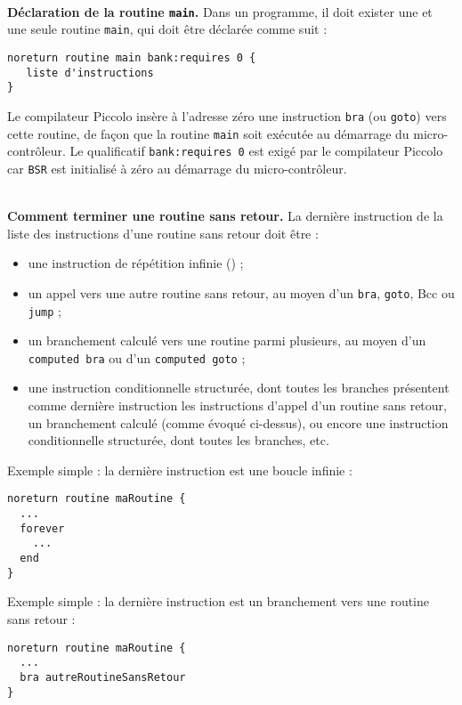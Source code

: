 ~\\
\textbf{Déclaration de la routine \texttt{main}.} Dans un programme, il doit exister une et une seule routine \texttt{main}, qui doit être déclarée comme suit :

\begin{lstlisting}[language=piccolo]
noreturn routine main bank:requires 0 {
   liste d'instructions
}

\end{lstlisting}

Le compilateur Piccolo insère à l’adresse zéro une instruction \texttt{bra} (ou \texttt{goto}) vers cette routine, de façon que la routine \texttt{main} soit exécutée au démarrage du micro-contrôleur. Le qualificatif \texttt{bank:requires 0} est exigé par le compilateur Piccolo car \texttt{BSR} est initialisé à zéro au démarrage du micro-contrôleur.


~\\
\textbf{Comment terminer une routine sans retour.} La dernière instruction de la liste des instructions d’une routine sans retour doit être :
\begin{itemize}
  \item une instruction de répétition infinie () ;
  \item un appel vers une autre routine sans retour, au moyen d’un \texttt{bra}, \texttt{goto}, Bcc ou \texttt{jump} ;
  \item un branchement calculé vers une routine parmi plusieurs, au moyen d’un \texttt{computed bra} ou d’un \texttt{computed goto} ;
  \item une instruction conditionnelle structurée, dont toutes les branches présentent comme dernière instruction les instructions d’appel d’un routine sans retour, un branchement calculé (comme évoqué ci-dessus), ou encore une instruction conditionnelle structurée, dont toutes les branches, etc.

\end{itemize}

Exemple simple : la dernière instruction est une boucle infinie :
\begin{lstlisting}[language=piccolo]
noreturn routine maRoutine {
  ...
  forever
    ...
  end
}
\end{lstlisting}

Exemple simple : la dernière instruction est un branchement vers une routine sans retour :
\begin{lstlisting}[language=piccolo]
noreturn routine maRoutine {
  ...
  bra autreRoutineSansRetour
}
\end{lstlisting}

